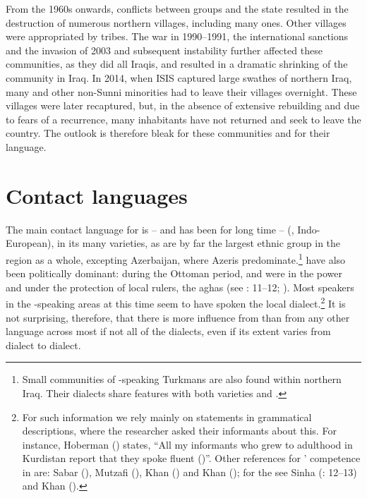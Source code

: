 \documentclass[output=paper]{langsci/langscibook}
\begin{document}
From the 1960s onwards, conflicts between  groups and the  state resulted in the destruction of numerous northern  villages, including many  ones. Other villages were appropriated by  tribes. The war in 1990–1991, the international sanctions and the invasion of 2003 and subsequent instability further affected these communities, as they did all Iraqis, and resulted in a dramatic shrinking of the  community in Iraq. In 2014, when ISIS captured large swathes of northern Iraq, many  and other non-Sunni minorities had to leave their villages overnight. These villages were later recaptured, but, in the absence of extensive rebuilding and due to fears of a recurrence, many inhabitants have not returned and seek to leave the country. The outlook is therefore bleak for these communities and for their language.

\section{\label{bkm:Ref534214034}Contact languages}

The main contact language for  is – and has been for long time –  (, Indo-European), in its many varieties, as  are by far the largest ethnic group in the region as a whole, excepting  Azerbaijan, where Azeris predominate.\footnote{Small communities of -speaking Turkmans are also found within northern Iraq. Their dialects share features with both   varieties and   \citep{Bulut2007}.}  have also been politically dominant: during the Ottoman period,  and  were in the power and under the protection of local  rulers, the aghas (see \citealt{Sinha2000}: 11–12; \citealt[223]{BrauerPatai1993}). Most  speakers in the -speaking areas at this time seem to have spoken the local  dialect.\footnote{For such information we rely mainly on statements in grammatical descriptions, where the researcher asked their informants about this. For instance, Hoberman (\citeyear[9]{Hoberman1989}) states, ``All my informants who grew to adulthood in Kurdistan report that they spoke fluent  ()''. Other references for ’ competence in  are: Sabar (\citeyear[216]{Sabar1978}), Mutzafi (\citeyear[5]{Mutzafi2004}), Khan (\citeyear[198]{Khan2007}) and Khan (\citeyear[11]{Khan2009}); for the  see Sinha (\citeyear{Sinha2000}: 12–13) and Khan (\citeyear[18]{Khan2008}).} It is not surprising, therefore, that there is more influence from  than from any other language across most if not all of the  dialects, even if its extent varies from dialect to dialect.
\end{document}
